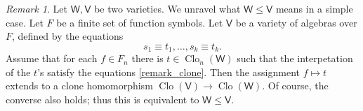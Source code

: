 \documentclass{amsart}
\theoremstyle{plain}
\theoremstyle{definition}
\theoremstyle{remark}
\newtheorem{remark}[theorem]{Remark}
\DeclareMathOperator{\Clo}{Clo}
\begin{document}
\begin{remark}
    Let $\mathsf{W}, \mathsf{V}$ be two varieties. 
    We unravel what $\mathsf{W} \le \mathsf{V}$ means in a simple case. 
    Let $F$ be a finite set of function symbols.
    Let $\mathsf{V}$ be a variety of algebras over $F$, defined by the equations 
    \begin{equation}
        \label{remark_clone}
        s_1 \equiv t_1,\ldots, s_k \equiv t_k \text{.}
    \end{equation} 
    Assume that for each $f \in F_n$ there is $t \in \Clo_n(\mathsf{W})$ such that the interpetation of the $t$'s satisfy the equations \eqref{remark_clone}. 
    Then the assignment $f \mapsto t$ extends to a clone homomorphism $\Clo(\mathsf{V}) \to \Clo(\mathsf{W})$. 
    Of course, the converse also holds; thus this is equivalent to $\mathsf{W} \le \mathsf{V}$. 
\end{remark}
\end{document}
